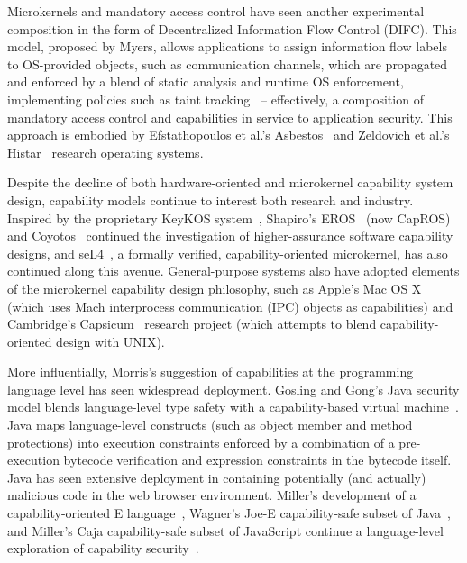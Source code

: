 Microkernels and mandatory access control have seen another experimental
composition in the form of Decentralized Information Flow Control (DIFC).
This model, proposed by Myers, allows applications to assign information flow labels
to OS-provided objects, such as communication channels, which are propagated and
enforced by a blend of static analysis and runtime OS enforcement, implementing
policies such as taint tracking~\cite{myers:difc} -- effectively, a composition of mandatory
access control and capabilities in service to application security.
This approach is embodied by Efstathopoulos et al.'s Asbestos~\cite{efstathopoulos:asbestos}
and Zeldovich et al.'s Histar~\cite{zeldovich:histar} research operating systems.

Despite the decline of both hardware-oriented and microkernel
capability system design, capability models continue to interest both
research and industry.  Inspired by the proprietary KeyKOS
system~\cite{hardy:keykos}, Shapiro's EROS~\cite{shapiro:eros} (now
CapROS) and Coyotos~\cite{shapiro:2004} continued the investigation of higher-assurance software
capability designs, and
seL4~\cite{klein:sel4}, a formally verified, capability-oriented
microkernel, has also continued along this avenue.
General-purpose systems also have adopted elements of the microkernel capability design
philosophy, such as Apple's Mac OS X~\cite{apple:macosx}
(which uses Mach interprocess communication (IPC)
objects as capabilities) and 
Cambridge's Capsicum~\cite{Watson10} research project 
(which attempts to blend capability-oriented design with UNIX).

More influentially, Morris's suggestion of capabilities at the programming language
level has seen widespread deployment.
Gosling and Gong's Java security model blends language-level type safety with a capability-based
virtual machine~\cite{gosling:javalanguage,Gong+97}.
Java maps language-level constructs (such as object member and method protections) into
execution constraints enforced by a combination of a pre-execution bytecode verification
and expression constraints in the bytecode itself.
Java has seen extensive deployment in containing potentially (and actually) malicious
code in the web browser environment.
Miller's development of a capability-oriented E language~\cite{miller:robustcomposition},
Wagner's Joe-E capability-safe
subset of Java~\cite{mettler:joee}, and Miller's Caja capability-safe subset of JavaScript continue a
language-level exploration of capability security~\cite{miller:caja}.

